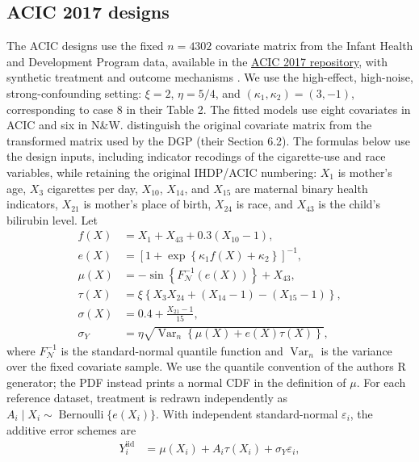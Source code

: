 \begin{landscape}
\subsection{ACIC 2017 designs}

The ACIC designs use the fixed \(n=4302\) covariate matrix from the Infant Health and Development Program data, available in the \href{https://github.com/vdorie/aciccomp/tree/master/2017}{ACIC 2017 repository}, with synthetic treatment and outcome mechanisms \cite{hahnAtlanticCausalInference2019}. We use the high-effect, high-noise, strong-confounding setting: \(\xi=2\), \(\eta=5/4\), and \((\kappa_1,\kappa_2)=(3,-1)\), corresponding to case 8 in their Table 2. The fitted models use eight covariates in ACIC and six in N\&W.  distinguish the original covariate matrix from the transformed matrix used by the DGP (their Section 6.2). The formulas below use the design inputs, including indicator recodings of the cigarette-use and race variables, while retaining the original IHDP/ACIC numbering: \(X_1\) is mother's age, \(X_3\) cigarettes per day, \(X_{10}\), \(X_{14}\), and \(X_{15}\) are maternal binary health indicators, \(X_{21}\) is mother's place of birth, \(X_{24}\) is race, and \(X_{43}\) is the child's bilirubin level. Let
\[
\begin{aligned}
f(X)&=X_1+X_{43}+0.3(X_{10}-1),\\
e(X)&=\left[1+\exp\!\left\{\kappa_1f(X)+\kappa_2\right\}\right]^{-1},\\
\mu(X)&=-\sin\!\left\{F_{\!\mathcal N}^{-1}(e(X))\right\}+X_{43},\\
\tau(X)&=\xi\left\{X_3X_{24}+(X_{14}-1)-(X_{15}-1)\right\},\\
\sigma(X)&=0.4+\frac{X_{21}-1}{15},\\
\sigma_Y&=\eta\sqrt{\operatorname{Var}_n\!\left\{\mu(X)+e(X)\tau(X)\right\}},
\end{aligned}
\]
where \(F_{\!\mathcal N}^{-1}\) is the standard-normal quantile function and \(\operatorname{Var}_n\) is the variance over the fixed covariate sample. We use the quantile convention of the authors\textquotesingle{} R generator; the PDF instead prints a normal CDF in the definition of \(\mu\). For each reference dataset, treatment is redrawn independently as \(A_i\mid X_i\sim\operatorname{Bernoulli}\{e(X_i)\}\). With independent standard-normal \(\varepsilon_i\), the additive error schemes are
\[
\begin{aligned}
Y_i^{\mathrm{iid}}&=\mu(X_i)+A_i\tau(X_i)+\sigma_Y\varepsilon_i,\\

\end{aligned}\]
\end{landscape}
